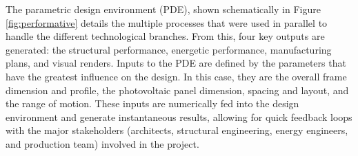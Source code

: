 
The parametric design environment (PDE), shown schematically in Figure \ref{fig:performative} details the multiple processes that were used in parallel to handle the different technological branches. From this, four key outputs are generated: the structural performance, energetic performance, manufacturing plans, and visual renders. Inputs to the PDE are defined by the parameters that have the greatest influence on the design. In this case, they are the overall frame dimension and profile, the photovoltaic panel dimension, spacing and layout, and the range of motion. These inputs are numerically fed into the design environment and generate instantaneous results, allowing for quick feedback loops with the major stakeholders (architects, structural engineering, energy engineers, and production team) involved in the project. \\



